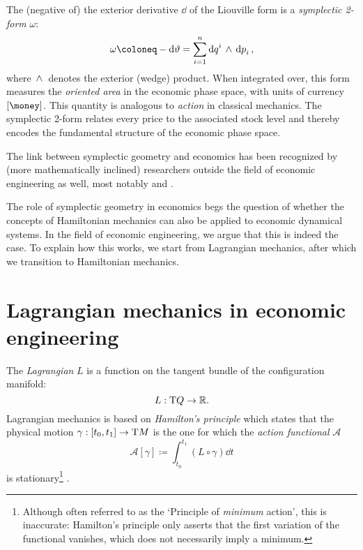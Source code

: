 The (negative of) the exterior derivative $\dd{}$ of the Liouville form is a \emph{symplectic 2-form} \(\omega\):
\begin{equation}
    \omega \coloneq -\dd{\theta} = \sum_{i = 1}^n \wedgep{\dd{q}^i}{\dd{p}_i},
\end{equation}
where $ \,\wedge\, $ denotes the exterior (wedge) product. When integrated over, this form measures the \emph{oriented area} in the economic phase space, with units of currency \([\si{\money}]\). This quantity is analogous to \emph{action} in classical mechanics. The symplectic 2-form relates every price to the associated stock level and thereby encodes the fundamental structure of the economic phase space.  

The link between symplectic geometry and economics has been recognized by (more mathematically inclined) researchers outside the field of economic engineering as well, most notably \citet{Russell2011} and \citet{Swierstra2014}.

The role of symplectic geometry in economics begs the question of whether the concepts of Hamiltonian mechanics can also be applied to economic dynamical systems. In the field of economic engineering, we argue that this is indeed the case. To explain how this works, we start from Lagrangian mechanics, after which we transition to Hamiltonian mechanics.

\section{Lagrangian mechanics in economic engineering}
\label{sec:lagrangian_ee}

The \emph{Lagrangian} $L$ is a function on the tangent bundle of the configuration manifold:
\begin{equation}
     L : \mathrm{T}Q \to \mathbb{R}.
\end{equation}
Lagrangian mechanics is based on \emph{Hamilton's principle} which states that the physical motion \(\gamma: \interval{t_0}{t_1} \to \tbundle{M}\) is the one for which the \emph{action functional} $\mathscr{A}$
\begin{equation}
    \mathscr{A}[\gamma] \coloneq \int_{t_0}^{t_1} (L\circ\gamma)\dd{t}
\end{equation}
is stationary\footnote{Although often referred to as the `Principle of \emph{minimum} action', this is inaccurate: Hamilton's principle only asserts that the first variation of the functional vanishes, which does not necessarily imply a minimum.} \cite{Arnold1989}.

